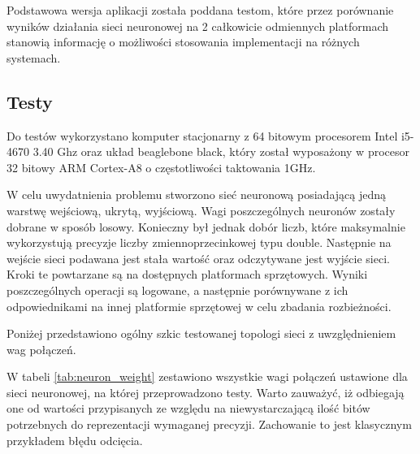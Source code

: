 Podstawowa wersja aplikacji została poddana testom, które przez porównanie wyników działania sieci neuronowej na 2 całkowicie odmiennych platformach stanowią informację o możliwości stosowania implementacji na różnych systemach.
 
\subsection{Testy}
Do testów wykorzystano komputer stacjonarny z 64 bitowym procesorem Intel i5-4670 3.40 Ghz oraz układ beaglebone black, który został wyposażony w procesor 32 bitowy ARM Cortex-A8 o częstotliwości taktowania 1GHz.

W celu uwydatnienia problemu stworzono sieć neuronową posiadającą jedną  warstwę wejściową, ukrytą, wyjściową. Wagi poszczególnych neuronów zostały dobrane w sposób losowy. Konieczny był jednak dobór liczb, które maksymalnie wykorzystują precyzje liczby zmiennoprzecinkowej typu double. Następnie na wejście sieci podawana jest stała wartość oraz odczytywane jest wyjście sieci. Kroki te powtarzane są na  dostępnych platformach sprzętowych. Wyniki poszczególnych operacji są logowane, a następnie porównywane z ich odpowiednikami na innej platformie sprzętowej w celu zbadania rozbieżności.

Poniżej przedstawiono ogólny szkic testowanej topologi sieci z uwzględnieniem wag połączeń.


W tabeli \ref{tab:neuron_weight} zestawiono wszystkie wagi połączeń ustawione dla sieci neuronowej, na której przeprowadzono testy. Warto zauważyć, iż odbiegają one od wartości przypisanych ze względu na niewystarczającą ilość bitów potrzebnych do reprezentacji wymaganej precyzji. Zachowanie to jest klasycznym przykładem błędu odcięcia.

